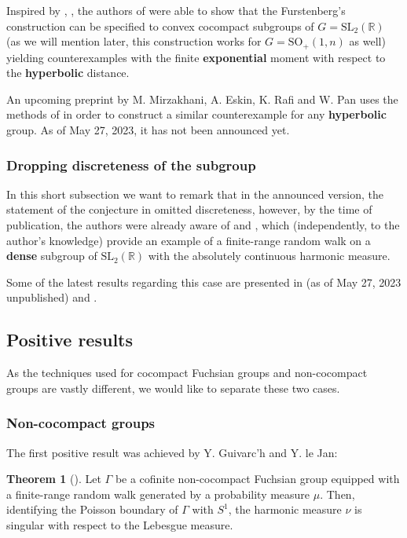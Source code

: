 \documentclass[11pt]{amsart}
\theoremstyle{definition}
\newtheorem{theorem}{Theorem}[section]
\begin{document}
	Inspired by \cite{furstenberg71}, \cite{connelmuchnik}, the authors of \cite{linaudpan} were able to show that the Furstenberg's construction can be specified to convex cocompact subgroups of $G = \text{SL}_2(\mathbb{R})$ (as we will mention later, this construction works for $G = \text{SO}_+(1, n)$ as well) yielding counterexamples with the finite \textbf{exponential} moment with respect to the \textbf{hyperbolic} distance.
	
	An upcoming preprint by M. Mirzakhani, A. Eskin, K. Rafi and W. Pan uses the methods of \cite{connelmuchnik} in order to construct a similar counterexample for any \textbf{hyperbolic} group. As of May 27, 2023, it has not been announced yet.
	
	\subsubsection{Dropping discreteness of the subgroup}
	In this short subsection we want to remark that in the announced version, the statement of the conjecture in \cite{kaimanovich2011matrix} omitted discreteness, however, by the time of publication, the authors were already aware of \cite{Bourgain2012} and \cite{MR2969625}, which (independently, to the author's knowledge) provide an example of a finite-range random walk on a \textbf{dense} subgroup of $\text{SL}_2(\mathbb{R})$ with the absolutely continuous harmonic measure.
	
	Some of the latest results regarding this case are presented in (as of May 27, 2023 unpublished) \cite{kogler2022local} and \cite{kittle2023absolutely}.
		
	\subsection{Positive results}
	
	As the techniques used for cocompact Fuchsian groups and non-cocompact groups are vastly different, we would like to separate these two cases.
	
	\subsubsection{Non-cocompact groups}
	
	The first positive result was achieved by Y. Guivarc'h and Y. le Jan:
	
	\begin{theorem}[\cite{guivarch1990}]
		\label{IntT: singular for non-cocompact}
		Let $\Gamma$ be a cofinite non-cocompact Fuchsian group equipped with a finite-range random walk generated by a probability measure $\mu$. Then, identifying the Poisson boundary of $\Gamma$ with $S^1$, the harmonic measure $\nu$ is singular with respect to the Lebesgue measure. 
	\end{theorem}
	
\end{document}
